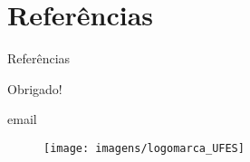 \documentclass[11pt]{beamer}
\newcommand{\email}{email}
\begin{document}
\section{Referências}
\begin{frame}{Referências}
    
\end{frame}

\begin{frame}

\begin{center}
    Obrigado!
    
    \email
\end{center}

\begin{figure}[htb]
    \centering
    \texttt{[image: imagens/logomarca\_UFES]}
\end{figure}

\end{frame}
\end{document}
